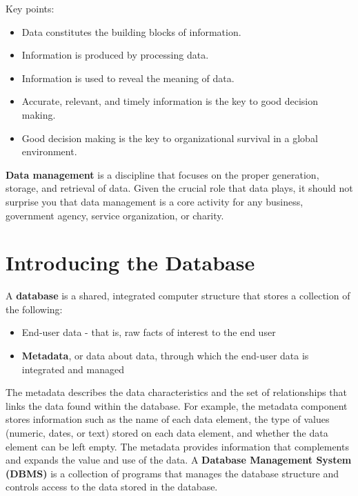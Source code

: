 \documentclass[a4paper, 12pt, titlepage]{report}
\begin{document}
Key points:
\begin{itemize}
\item Data constitutes the building blocks of information.
\item Information is produced by processing data.
\item Information is used to reveal the meaning of data.
\item Accurate, relevant, and timely information is the key to good decision making.
\item Good decision making is the key to organizational survival in a global environment.
\end{itemize}
\textbf{Data management} is a discipline that focuses on the proper generation, storage, and retrieval of data. Given the crucial role that data plays, it should not surprise you that data management is a core activity for any business, government agency, service organization, or charity.
\section{Introducing the Database}
A \textbf{database} is a shared, integrated computer structure that stores a collection of the following:
\begin{itemize}
\item End-user data - that is, raw facts of interest to the end user
\item \textbf{Metadata}, or data about data, through which the end-user data is integrated and managed
\end{itemize}
The metadata describes the data characteristics and the set of relationships that links the data found within the database. For example, the metadata component stores information such as the name of each data element, the type of values (numeric, dates, or text) stored on each data element, and whether the data element can be left empty. The metadata provides information that complements and expands the value and use of the data.
A \textbf{Database Management System (DBMS)} is a collection of programs that manages the database structure and controls access to the data stored in the database.
\end{document}
